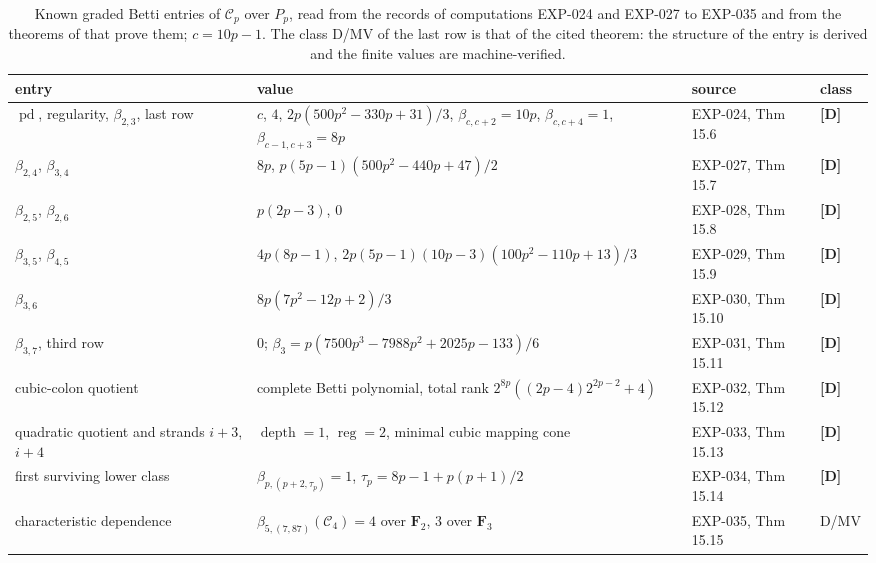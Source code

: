 \documentclass[11pt]{article}
\theoremstyle{definition}
\theoremstyle{remark}
\newcommand{\Cfiber}{\mathcal{C}}
\newcommand{\mD}{\textbf{[D]}}
\begin{document}
\begin{table}[ht]
\centering
\small
\begin{tabular}{@{}>{\raggedright\arraybackslash}p{}>{\raggedright\arraybackslash}p{}>{\raggedright\arraybackslash}p{}l@{}}
\toprule
entry & value & source & class\\
\midrule
$\operatorname{pd}$, regularity, $\beta_{2,3}$, last row & $c$, $4$, $2p(500p^2-330p+31)/3$, $\beta_{c,c+2}=10p$, $\beta_{c,c+4}=1$, $\beta_{c-1,c+3}=8p$ & EXP-024, Thm 15.6 & \mD\\
$\beta_{2,4}$, $\beta_{3,4}$ & $8p$, $p(5p-1)(500p^2-440p+47)/2$ & EXP-027, Thm 15.7 & \mD\\
$\beta_{2,5}$, $\beta_{2,6}$ & $p(2p-3)$, $0$ & EXP-028, Thm 15.8 & \mD\\
$\beta_{3,5}$, $\beta_{4,5}$ & $4p(8p-1)$, $2p(5p-1)(10p-3)(100p^2-110p+13)/3$ & EXP-029, Thm 15.9 & \mD\\
$\beta_{3,6}$ & $8p(7p^2-12p+2)/3$ & EXP-030, Thm 15.10 & \mD\\
$\beta_{3,7}$, third row & $0$; $\beta_3=p(7500p^3-7988p^2+2025p-133)/6$ & EXP-031, Thm 15.11 & \mD\\
cubic-colon quotient & complete Betti polynomial, total rank $2^{8p}((2p-4)2^{2p-2}+4)$ & EXP-032, Thm 15.12 & \mD\\
quadratic quotient and strands $i+3$, $i+4$ & $\operatorname{depth}=1$, $\operatorname{reg}=2$, minimal cubic mapping cone & EXP-033, Thm 15.13 & \mD\\
first surviving lower class & $\beta_{p,(p+2,\tau_p)}=1$, $\tau_p=8p-1+p(p+1)/2$ & EXP-034, Thm 15.14 & \mD\\
characteristic dependence & $\beta_{5,(7,87)}(\Cfiber_4)=4$ over $\mathbf F_2$, $3$ over $\mathbf F_3$ & EXP-035, Thm 15.15 & D/MV\\
\bottomrule
\end{tabular}
\caption{Known graded Betti entries of $\Cfiber_p$ over $P_p$, read from the records of computations
EXP-024 and EXP-027 to EXP-035 and from the theorems of \cite{SantibanezLeal2026} that prove them; $c=10p-1$.
The class D/MV of the last row is that of the cited theorem: the structure of the entry is derived and the
finite values are machine-verified.}
\label{tab:betti}
\end{table}
\end{document}

